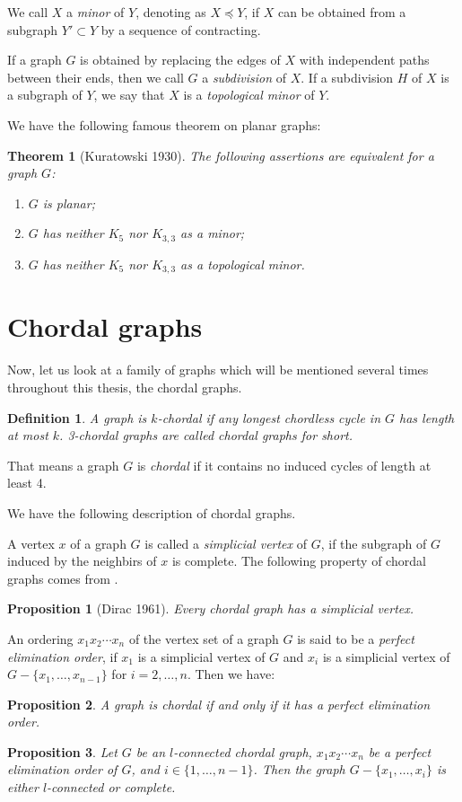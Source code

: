 \documentclass[12pt]{report}
\newtheorem{theorem}{Theorem}
\newtheorem{definition}{Definition}
\newtheorem{proposition}{Proposition}
\begin{document}
We call $X$ a {\em minor} of $Y$, denoting as $X\preccurlyeq Y$, if $X$ can be obtained from a subgraph $Y'\subset Y$ by a sequence of contracting. 

If a graph $G$ is obtained by replacing the edges of $X$ with independent paths between their ends, then we call $G$ a {\em subdivision} of $X$. If a subdivision $H$ of $X$ is a subgraph of $Y$, we say that $X$ is a {\em topological minor} of $Y$.

We have the following famous theorem on planar graphs:
\begin{theorem}[Kuratowski 1930]\label{plgfodmthmku}
The following assertions are equivalent for a graph $G$:
\begin{enumerate}
\item $G$ is planar;
\item $G$ has neither $K_5$ nor $K_{3,3}$ as a minor;
\item $G$ has neither $K_5$ nor $K_{3,3}$ as a topological minor.
\end{enumerate}
\end{theorem}




\section{Chordal graphs}

Now, let us look at a family of graphs which will be mentioned several times throughout this thesis, the chordal graphs.

\begin{definition}\label{defchor}
A graph is $k$-chordal if any longest chordless cycle in $G$ has length at most $k$. 3-chordal graphs are called chordal graphs for short.
\end{definition}
That means a graph $G$ is {\em chordal} if it contains no induced cycles of length at least 4.

We have the following description of chordal graphs.

A vertex $x$ of a graph $G$ is called a {\em simplicial vertex} of $G$, if the subgraph of $G$ induced by the neighbirs of $x$ is complete.
The following property of chordal graphs comes from \cite{dirac1961rigid}.
\begin{proposition}[Dirac 1961]\label{pdir61}
Every chordal graph has a simplicial vertex.
\end{proposition}

An ordering $x_1x_2\cdots x_n$ of the vertex set of a graph $G$ is said to be a {\em perfect elimination order}, if $x_1$ is a simplicial vertex of $G$ and $x_i$ is a simplicial vertex of $G-\{x_1,\ldots,x_{n-1}\}$ for $i=2,\ldots,n$. Then we have:
\begin{proposition}\label{c2.2}
A graph is chordal if and only if it has a perfect elimination order.
\end{proposition}
\begin{proposition}\label{c2.3}
Let $G$ be an $l$-connected chordal graph, $x_1x_2\cdots x_n$ be a perfect elimination order of $G$, and $i\in\{1,\ldots,n-1\}$. Then the graph $G-\{x_1,\ldots,x_i\}$ is either $l$-connected or complete.
\end{proposition}
\end{document}
